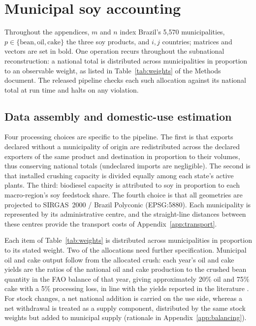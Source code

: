 \section{Municipal soy accounting}\label{app:accounting}

Throughout the appendices, $m$ and $n$ index Brazil's 5{,}570
municipalities, $p\in\{\text{bean},\text{oil},\text{cake}\}$ the three soy
products, and $i,j$ countries; matrices and vectors are set in bold.
One operation recurs throughout the subnational reconstruction:
a national total is distributed across municipalities in proportion to
an observable weight, as listed in Table~\ref{tab:weights} of the
Methods document. The released pipeline checks each such allocation
against its national total at run time and halts on any violation.

\subsection{Data assembly and domestic-use estimation}\label{subsubsec:domuse}
\label{subsubsec:assemble}
Four processing choices are specific to the pipeline. The first is that exports declared without a municipality of origin are redistributed
across the declared exporters of the same product and destination in
proportion to their volumes, thus conserving national totals (undeclared
imports are negligible). The second is that installed crushing capacity is
divided equally among each state's active plants. The third: biodiesel
capacity is attributed to soy in proportion to each macro-region's soy feedstock
share. The fourth choice is that all geometries are projected to SIRGAS~2000 /
Brazil Polyconic (EPSG:5880). Each municipality is represented by
its administrative centre, and the straight-line distances between
these centres provide the transport costs of
Appendix~\ref{app:transport}.

Each item of Table~\ref{tab:weights} is distributed across
municipalities in proportion to its stated weight. Two of the
allocations need further specification. Municipal oil and cake output
follow from the allocated crush: each year's oil and cake yields are
the ratios of the national oil and cake production to the crushed bean
quantity in the FAO balance of that year, giving approximately 20\%
oil and 75\% cake with a 5\% processing loss, in line with the yields
reported in the literature \cite{smaling2008soy,dei2011soybean}. For
stock changes, a net national addition is carried on the
use side, whereas a net withdrawal is treated as a supply component,
distributed by the same stock weights but added to municipal supply
(rationale in Appendix~\ref{app:balancing}).

